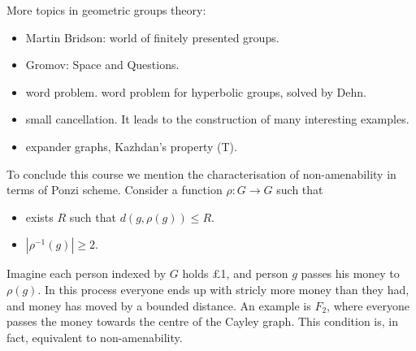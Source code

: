 \documentclass[a4paper]{article}
\begin{document}
More topics in geometric groups theory:
\begin{itemize}
\item Martin Bridson: world of finitely presented groups. 
\item Gromov: Space and Questions.
\item word problem. word problem for hyperbolic groups, solved by Dehn.
\item small cancellation. It leads to the construction of many interesting examples.
\item expander graphs, Kazhdan's property (T).
\end{itemize}

To conclude this course we mention the characterisation of non-amenability in terms of Ponzi scheme. Consider a function \(\rho: G \to G\) such that
\begin{itemize}
\item exists \(R\) such that \(d(g, \rho(g)) \leq R\).
\item \(|\rho^{-1}(g)| \geq 2\).
\end{itemize}
Imagine each person indexed by \(G\) holds £1, and person \(g\) passes his money to \(\rho(g)\). In this process everyone ends up with stricly more money than they had, and money has moved by a bounded distance. An example is \(F_2\), where everyone passes the money towards the centre of the Cayley graph. This condition is, in fact, equivalent to non-amenability.





\printindex
\end{document}
